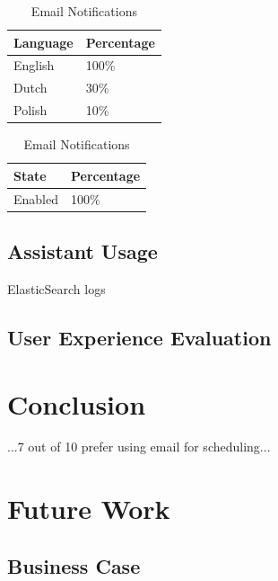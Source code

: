 \documentclass{article}
\begin{document}
\begin{table}[!htb]
    \begin{minipage}{.5\linewidth}
   	 \caption{Email Languages}
      \centering
        \begin{tabular}{ll}
	        \hline
            \textbf{Language} & \textbf{Percentage} \\
            \hline
            English & 100\% \\
            Dutch & 30\% \\
            Polish & 10\% \\
            \hline
        \end{tabular}
    \end{minipage}%
    \hspace{.1cm}
    \begin{minipage}{.5\linewidth}
      \centering
	    \caption{Email Notifications}
        \begin{tabular}{ll}
	        \hline
            \textbf{State} & \textbf{Percentage} \\
            \hline
            Enabled & 100\% \\
            \hline
        \end{tabular}
    \end{minipage} 
\end{table}

\subsection{Assistant Usage}

ElasticSearch logs

\subsection{User Experience Evaluation}

\newpage

\section{Conclusion}

...7 out of 10 prefer using email for scheduling...

\newpage

\section{Future Work}

\subsection{Business Case}
\end{document}
